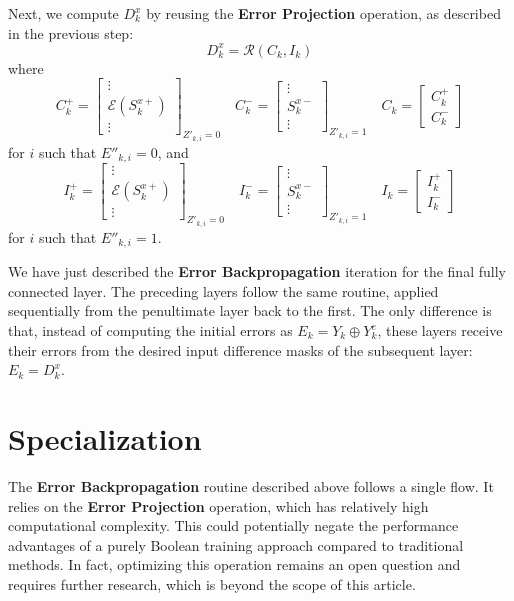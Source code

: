 \documentclass{article}
\theoremstyle{definition}
\theoremstyle{remark}
\begin{document}
Next, we compute \( D^x_k \) by reusing the \textbf{Error Projection} operation, as described in the previous step:
\[ D^x_k = \mathcal{R}(C_k, I_k) \]
where
\[
    C^+_k = \begin{bmatrix} \vdots \\ \mathcal{E}(S^{x+}_k) \\ \vdots \end{bmatrix}_{Z'_{k,i} = 0} \quad
    C^-_k = \begin{bmatrix} \vdots \\ S^{x-}_k \\ \vdots \end{bmatrix}_{Z'_{k,i} = 1} \quad
    C_k = \begin{bmatrix} C^+_k \\ C^-_k \end{bmatrix}
\]
for \( i \) such that \( E''_{k,i} = 0 \), and
\[
    I^+_k = \begin{bmatrix} \vdots \\ \mathcal{E}(S^{x+}_k) \\ \vdots \end{bmatrix}_{Z'_{k,i} = 0} \quad
    I^-_k = \begin{bmatrix} \vdots \\ S^{x-}_k \\ \vdots \end{bmatrix}_{Z'_{k,i} = 1} \quad
    I_k = \begin{bmatrix} I^+_k \\ I^-_k \end{bmatrix}
\]
for \( i \) such that \( E''_{k,i} = 1 \).

We have just described the \textbf{Error Backpropagation} iteration for the final fully connected layer. The preceding layers follow the same routine, applied sequentially from the penultimate layer back to the first. The only difference is that, instead of computing the initial errors as \( E_k = Y_k \oplus Y^e_k \), these layers receive their errors from the desired input difference masks of the subsequent layer: \( E_k = D^x_k \).

\section{Specialization}
The \textbf{Error Backpropagation} routine described above follows a single flow. It relies on the \textbf{Error Projection} operation, which has relatively high computational complexity. This could potentially negate the performance advantages of a purely Boolean training approach compared to traditional methods. In fact, optimizing this operation remains an open question and requires further research, which is beyond the scope of this article.
\end{document}
